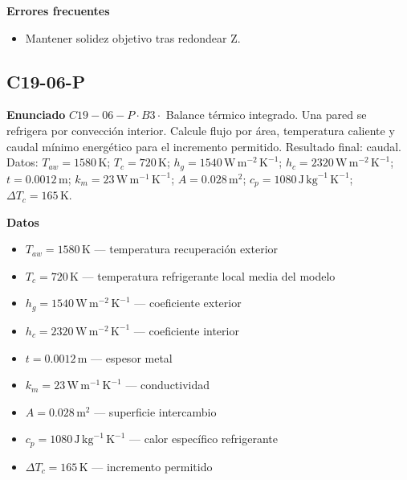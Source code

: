 \documentclass[10pt,openany]{book}
\begin{document}
\noindent\textbf{Errores frecuentes}
\begin{itemize}
\item Mantener solidez objetivo tras redondear Z.
\end{itemize}
\begin{center}\end{center}
\subsection*{C19-06-P}

\noindent\textbf{Enunciado}
\(C19-06-P \cdot B3 \cdot\) Balance térmico integrado. Una pared se refrigera por convección interior. Calcule flujo por área, temperatura caliente y caudal mínimo energético para el incremento permitido. Resultado final: caudal. Datos: \(T_{aw}=1580\, \mathrm{K}\); \(T_c=720\, \mathrm{K}\); \(h_g=1540\, \mathrm{W}\,\mathrm{m}^{-2}\,\mathrm{K}^{-1}\); \(h_c=2320\, \mathrm{W}\,\mathrm{m}^{-2}\,\mathrm{K}^{-1}\); \(t=0.0012\, \mathrm{m}\); \(k_m=23\, \mathrm{W}\,\mathrm{m}^{-1}\,\mathrm{K}^{-1}\); \(A=0.028\, \mathrm{m}^{2}\); \(c_p=1080\, \mathrm{J}\,\mathrm{kg}^{-1}\,\mathrm{K}^{-1}\); \(\Delta T_c=165\, \mathrm{K}\).

\noindent\textbf{Datos}
\begin{itemize}
\item $T_{aw} = 1580\,\mathrm{K}$ — temperatura recuperación exterior
\item $T_c = 720\,\mathrm{K}$ — temperatura refrigerante local media del modelo
\item $h_g = 1540\,\mathrm{W}\,\mathrm{m}^{-2}\,\mathrm{K}^{-1}$ — coeficiente exterior
\item $h_c = 2320\,\mathrm{W}\,\mathrm{m}^{-2}\,\mathrm{K}^{-1}$ — coeficiente interior
\item $t = 0.0012\,\mathrm{m}$ — espesor metal
\item $k_m = 23\,\mathrm{W}\,\mathrm{m}^{-1}\,\mathrm{K}^{-1}$ — conductividad
\item $A = 0.028\,\mathrm{m}^{2}$ — superficie intercambio
\item $c_p = 1080\,\mathrm{J}\,\mathrm{kg}^{-1}\,\mathrm{K}^{-1}$ — calor específico refrigerante
\item $\Delta T_c = 165\,\mathrm{K}$ — incremento permitido
\end{itemize}
\end{document}
